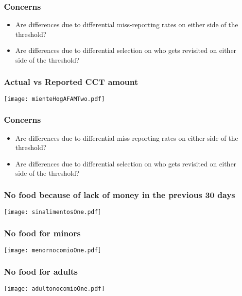 \documentclass{beamer}
\begin{document}
\begin{frame}
\frametitle{Concerns}
\begin{itemize}
	\item Are differences due to differential miss-reporting rates on either side of the threshold?
	\item {\color{gray}Are differences due to differential selection on who gets revisited on either side of the threshold?}
\end{itemize}
\end{frame}

\begin{frame}
\frametitle{Actual vs Reported CCT amount}
\begin{center}
	\texttt{[image: mienteHogAFAMTwo.pdf]}
	\label{mienteHogAFAMTwo}
\end{center}
\end{frame}

\begin{frame}
\frametitle{Concerns}
\begin{itemize}
	\item {\color{gray}Are differences due to differential miss-reporting rates on either side of the threshold?}
	\item Are differences due to differential selection on who gets revisited on either side of the threshold?
\end{itemize}
\end{frame}

\begin{frame}
\frametitle{No food because of lack of money in the previous 30 days}
\begin{center}
	\texttt{[image: sinalimentosOne.pdf]}
	\label{sinalimentosOne}
\end{center}
\end{frame}

\begin{frame}
\frametitle{No food for minors}
\begin{center}
\texttt{[image: menornocomioOne.pdf]}
\label{menornocomioOne}
\end{center}
\end{frame}

\begin{frame}
\frametitle{No food for adults}
\begin{center}
	\texttt{[image: adultonocomioOne.pdf]}
	\label{adultonocomioOne}
\end{center}
\end{frame}
\end{document}
